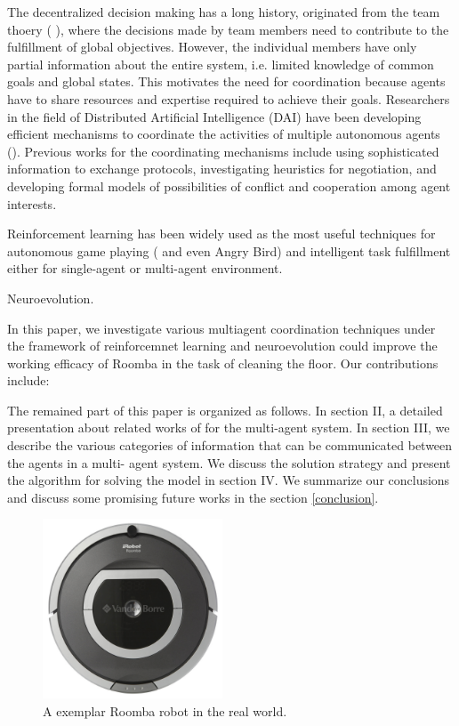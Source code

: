 \documentclass[conference]{IEEEtran}
\begin{document}
The decentralized decision making has a long history, originated from the team
thoery (\hspace*{-0.8mm} \cite{marschak1955elements, radner1962team,
    radner1959application, ho1972team, tsitsiklis1985complexity}),
where the decisions made by team members need to contribute to the fulfillment
of global objectives. However, the individual members have only partial
information about the entire system, i.e. limited knowledge of common goals
and global states. This motivates the need for coordination because agents
have to share resources and expertise required to achieve their goals.
Researchers in the field of Distributed Artificial Intelligence (DAI) have
been developing efficient mechanisms to coordinate the activities of multiple
autonomous agents (\cite{weiss1999multiagent}).  Previous works for the coordinating mechanisms include
using sophisticated information to exchange protocols, investigating
heuristics for negotiation, and developing formal models of possibilities of
conflict and cooperation among agent interests. 

Reinforcement learning has been widely used as the most useful techniques for
autonomous game playing ( and even Angry Bird) and intelligent task
fulfillment either for single-agent or multi-agent environment. 

Neuroevolution.

In this paper, we
investigate various multiagent coordination techniques under the framework of
reinforcemnet learning and neuroevolution could improve the working efficacy
of Roomba in the task of cleaning the floor. 
Our contributions include: 

The remained part of this paper is organized as follows. 
In section II, a detailed presentation about related works of for the multi-agent system. In section III, we describe the various categories of information that can be communicated between the agents in a multi- agent system. We discuss the solution strategy and present the algorithm for solving the model in section IV. We summarize our
conclusions and discuss some promising future works in the section
\ref{conclusion}.

\begin{figure}[!t]
\centering
\includegraphics[width=2.1in,height=2.1in]{./figures/irobot_roomba.jpg}
\caption{A exemplar Roomba robot in the real world.}
\label{roomba:world}
\end{figure}
\end{document}
